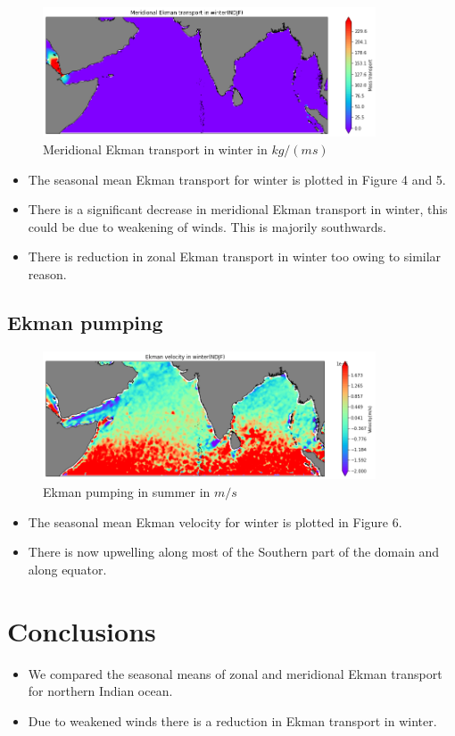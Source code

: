 \documentclass[20pt]{article}
\begin{document}
\begin{figure}
    \centering
    \includegraphics[width=0.88\textwidth]{winter_meridional_trans.png}
    \caption{Meridional Ekman transport in winter in $kg/(m s)$}
\end{figure}

\begin{itemize}
    \item The seasonal mean Ekman transport for winter is plotted in Figure 4 and 5.
    \item There is a significant decrease in meridional Ekman transport in winter, this could be due to weakening of winds. This is majorily southwards.
    \item There is reduction in zonal Ekman transport in winter too owing to similar reason.

\end{itemize}

\subsection*{Ekman pumping}

\begin{figure}
    \centering
    \includegraphics[width=0.88\textwidth]{winter_we.png}
    \caption{Ekman pumping in summer in $m/s$}
\end{figure}

\begin{itemize}
    \item The seasonal mean Ekman velocity for winter is plotted in Figure 6.
    \item There is now upwelling along most of the Southern part of the domain and along equator.
\end{itemize}


\section*{Conclusions}

\begin{itemize}
    \item We compared the seasonal means of zonal and meridional Ekman transport for northern Indian ocean.
    \item Due to weakened winds there is a reduction in Ekman transport in winter.
\end{itemize}
\end{document}
